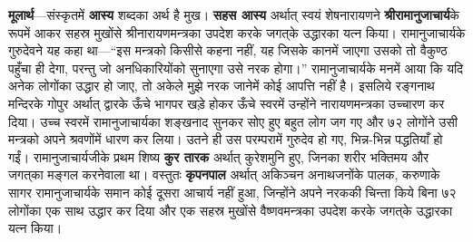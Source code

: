 \begin{sloppypar}\justifying{}
\textbf{मूलार्थ}—संस्कृतमें \textbf{आस्य} शब्दका अर्थ है मुख। \textbf{सहस आस्य} अर्थात् स्वयं शेषनारायणने \textbf{श्रीरामानुजाचार्य}के रूपमें आकर सहस्र मुखोंसे श्रीनारायण\-मन्त्रका उपदेश करके जगत्‌के उद्धारका यत्न किया। रामानुजाचार्यके गुरुदेवने यह कहा था—“इस मन्त्रको किसीसे कहना नहीं, यह जिसके कानमें जाएगा उसको तो वैकुण्ठ पहुँचा ही देगा, परन्तु जो अनधिकारियोंको सुनाएगा उसे नरक होगा।” रामानुजाचार्यके मनमें आया कि यदि अनेक लोगोंका उद्धार हो जाए, तो अकेले मुझे नरक जानेमें कोई आपत्ति नहीं है। इसलिये रङ्गनाथ मन्दिरके गोपुर अर्थात् द्वारके ऊँचे भागपर खड़े होकर ऊँचे स्वरमें उन्होंने नारायण\-मन्त्रका उच्चारण कर दिया। उच्च स्वरमें रामानुजाचार्यका शङ्खनाद सुनकर सोए हुए बहुत लोग जग गए और ७२ लोगोंने उसी मन्त्रको अपने श्रवणोंमें धारण कर लिया। उतने ही उस परम्परामें गुरुदेव हो गए, भिन्न-भिन्न पद्धतियाँ हो गईं। रामानुजाचार्यजीके प्रथम शिष्य \textbf{कुर तारक} अर्थात् कुरेशमुनि हुए, जिनका शरीर भक्तिमय और जगत्‌का मङ्गल करनेवाला था। वस्तुतः \textbf{कृपनपाल} अर्थात् अकिञ्चन अनाथजनोंके पालक, करुणाके सागर रामानुजाचार्यके समान कोई दूसरा आचार्य नहीं हुआ, जिन्होंने अपने नरककी चिन्ता किये बिना ७२ लोगोंका एक साथ उद्धार कर दिया और एक सहस्र मुखोंसे वैष्णव\-मन्त्रका उपदेश करके जगत्‌के उद्धारका यत्न किया।
\end{sloppypar}


